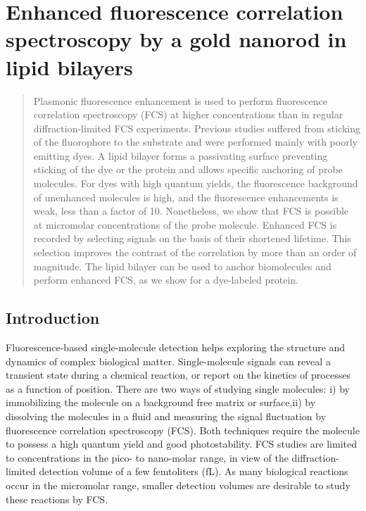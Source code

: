 \chapter{Enhanced fluorescence correlation spectroscopy by a gold nanorod in lipid bilayers}
\label{chapter:EFCS}

\graphicspath{{chapters/c2_bilayer_efcs/figure/}}
\begin{abstract}
	Plasmonic fluorescence enhancement is used to perform fluorescence correlation spectroscopy (FCS) at higher concentrations than in regular diffraction-limited FCS experiments.
	Previous studies suffered from sticking of the fluorophore to the substrate and were performed mainly with poorly emitting dyes.
	A lipid bilayer forms a passivating surface preventing sticking of the dye or the protein and allows specific anchoring of probe molecules.
	For dyes with high quantum yields, the fluorescence background of unenhanced molecules is high, and the fluorescence enhancements is weak, less than a factor of 10.
	Nonetheless, we show that FCS is possible at micromolar concentrations of the probe molecule.
	Enhanced FCS is recorded by selecting signals on the basis of their shortened lifetime.
	This selection improves the contrast of the correlation by more than an order of magnitude.
	The lipid bilayer can be used to anchor biomolecules and perform enhanced FCS, as we show for a dye-labeled protein.
\end{abstract}
\newpage

\section{Introduction}
Fluorescence-based single-molecule detection helps exploring the structure and dynamics of complex biological matter.\cite{moerner1999illuminating,weiss1999fluorescence}
Single-molecule signals can reveal a transient state during a chemical reaction, or report on the kinetics of processes as a function of position.
There are two ways of studying single molecules: i) by immobilizing the molecule on a background free matrix or surface,ii) by dissolving the molecules in a fluid and measuring the signal fluctuation by fluorescence correlation spectroscopy (FCS).\cite{magde1972thermodynamic}
Both techniques require the molecule to possess a high quantum yield and good photostability.
FCS studies are limited to concentrations in the pico- to nano-molar range, in view of the diffraction-limited detection volume of a few femtoliters (fL).
As many biological reactions occur in the micromolar range\cite{craighead2006future}, smaller detection volumes are desirable to study these reactions by FCS.


